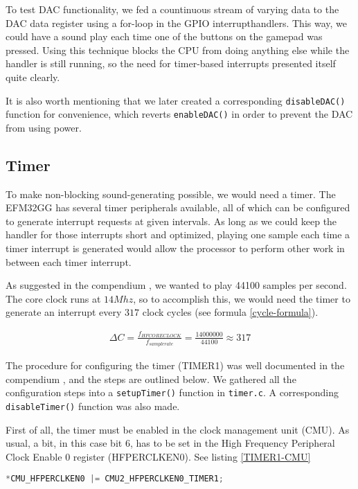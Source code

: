 To test DAC functionality, we fed a countinuous stream of varying data to the DAC data register using a for-loop in the GPIO interrupthandlers. This way, we could have a sound play each time one of the buttons on the gamepad was pressed. Using this technique blocks the CPU from doing anything else while the handler is still running, so the need for timer-based interrupts presented itself quite clearly.

It is also worth mentioning that we later created a corresponding \texttt{disableDAC()} function for convenience, which reverts \texttt{enableDAC()} in order to prevent the DAC from using power.

\subsection{Timer}
To make non-blocking sound-generating possible, we would need a timer. The EFM32GG has several timer peripherals available, all of which can be configured to generate interrupt requests at given intervals. As long as we could keep the handler for those interrupts short and optimized, playing one sample each time a timer interrupt is generated would allow the processor to perform other work in between each timer interrupt.

As suggested in the compendium \cite[p.~42]{compendium}, we wanted to play 44100 samples per second. The core clock runs at $14Mhz$, so to accomplish this, we would need the timer to generate an interrupt every $317$ clock cycles (see formula \ref{cycle-formula}).

\begin{gather}
\label{cycle-formula}
\Delta C = \frac{f_{HFCORECLOCK}}{f_{samplerate}} = \frac{14000000}{44100} \approx 317
\end{gather}

The procedure for configuring the timer (TIMER1) was well documented in the compendium \cite[p.~40]{compendium}, and the steps are outlined below. We gathered all the configuration steps into a \texttt{setupTimer()} function in \texttt{timer.c}. A corresponding \texttt{disableTimer()} function was also made.

First of all, the timer must be enabled in the clock management unit (CMU). As usual, a bit, in this case bit 6, has to be set in the High Frequency Peripheral Clock Enable 0 register (HFPERCLKEN0). See listing \ref{TIMER1-CMU}

\begin{lstlisting}[language=C, label=TIMER1-CMU, caption=Enabling the timer in the CMU]
*CMU_HFPERCLKEN0 |= CMU2_HFPERCLKEN0_TIMER1;
\end{lstlisting}

